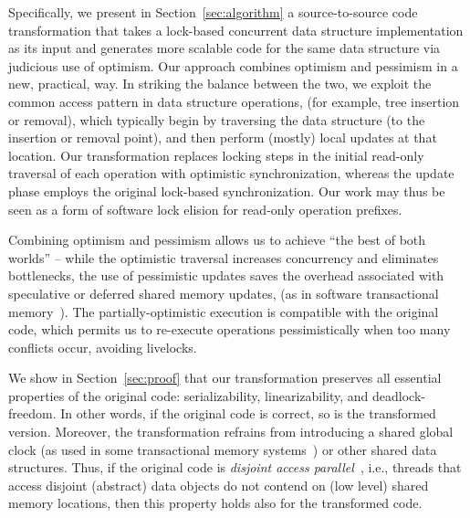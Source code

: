 Specifically, we present in Section~\ref{sec:algorithm} a source-to-source
code transformation that takes a lock-based concurrent data structure implementation as its input
and generates more scalable code for the same data structure via judicious use of optimism.
Our approach combines optimism and pessimism in a new, practical, way.
In striking the balance between the two, we exploit the common access pattern in data structure operations,
(for example, tree insertion or removal), which typically begin by traversing the data structure (to the insertion or removal point), and then perform (mostly) local updates at that location.
Our transformation replaces locking steps in the initial read-only traversal of each operation with
optimistic synchronization, whereas the update phase employs the original lock-based synchronization.
Our work may thus be seen as a form of software lock elision for read-only operation prefixes.

Combining optimism and pessimism allows us to achieve ``the best of both worlds'' -- while the
optimistic traversal increases concurrency and eliminates bottlenecks,
the use of pessimistic updates saves the overhead associated with speculative or deferred shared
memory updates, (as in software transactional memory~\cite{HLR:SLCA2010}).
The partially-optimistic execution is compatible with the original code, which permits us to re-execute operations
pessimistically when too many conflicts occur, avoiding livelocks.

We show in Section~\ref{sec:proof} that our transformation preserves all essential properties of the original code: serializability, linearizability, and deadlock-freedom. In other words, if the original code is correct, so is the
transformed version. Moreover, the transformation
refrains from introducing a shared global clock (as used in some transactional memory systems~\cite{DBLP:conf/eurosys/ShalevS06}) or other
shared data structures. Thus, if the original code is \emph{disjoint access parallel}~\cite{Israeli:1994:DIS:197917.198079}, i.e., threads
that access disjoint (abstract) data objects do not contend on (low level) shared memory locations, then this
property holds also for the transformed code.

